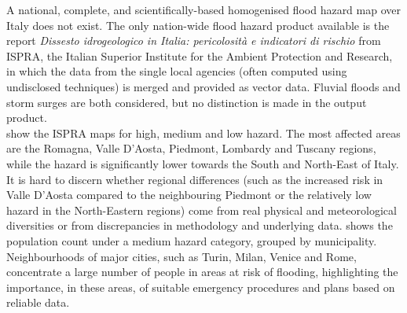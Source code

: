 A national, complete, and scientifically-based homogenised flood hazard map over Italy does not exist. The only nation-wide flood hazard product available is the report \textit{Dissesto idrogeologico in Italia: pericolosità e indicatori di rischio} \citep{ISPRA2018} from ISPRA, the Italian Superior Institute for the Ambient Protection and Research, in which the data from the single local agencies (often computed using undisclosed techniques) is merged and provided as vector data. Fluvial floods and storm surges are both considered, but no distinction is made in the output product.\\  show the ISPRA maps for high, medium and low hazard. The most affected areas are the Romagna, Valle D'Aosta, Piedmont, Lombardy and Tuscany regions, while the hazard is significantly lower towards the South and North-East of Italy. It is hard to discern whether regional differences (such as the increased risk in Valle D'Aosta compared to the neighbouring Piedmont or the relatively low hazard in the North-Eastern regions) come from real physical and meteorological diversities or from discrepancies in methodology and underlying data.  shows the population count under a medium hazard category, grouped by municipality. Neighbourhoods of major cities, such as Turin, Milan, Venice and Rome, concentrate a large number of people in areas at risk of flooding, highlighting the importance, in these areas, of suitable emergency procedures and plans based on reliable data.
